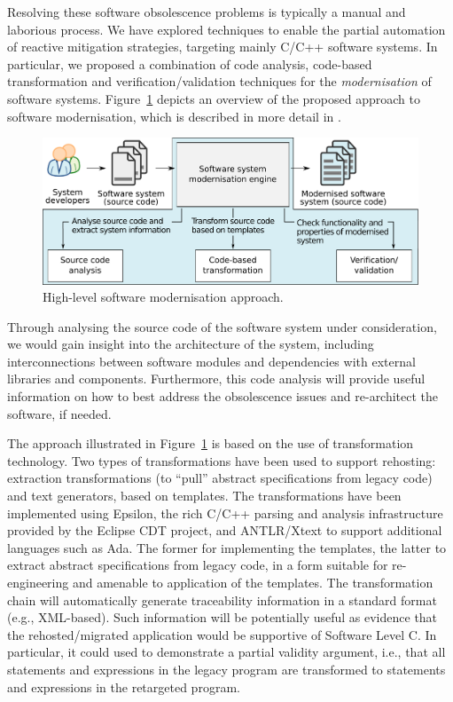 \documentclass{llncs}
\begin{document}
Resolving these software obsolescence problems is typically a manual and laborious process. We have explored techniques to enable the partial 
automation of reactive mitigation strategies, targeting mainly C/C++ software 
systems. In particular, we proposed a combination of code analysis, code-based 
transformation and verification/validation techniques for the 
\textit{modernisation} of software systems.
Figure~\ref{fig:approach} depicts an overview of the proposed approach to 
software modernisation, which is described in more detail in \cite{Gerasimou2017}.

\begin{figure}[htbp]
	\vspace*{-2em}
	\centering
	\includegraphics[width=.9\linewidth]{architecture.pdf}
	
	\caption{High-level software modernisation approach.}
	\label{fig:approach}
	
	\vspace*{-2em}
\end{figure}

Through analysing the source code of the software system under consideration, 
we would gain insight into the architecture of the system, including 
interconnections between software modules and dependencies with 
external libraries and components. Furthermore, this code analysis will provide 
useful information on how to best address the obsolescence issues and 
re-architect the software, if needed.

The approach illustrated in Figure~\ref{fig:approach} is based on the use of transformation technology.
Two types of transformations have been used to support rehosting: extraction 
transformations (to ``pull'' abstract specifications from legacy code) and text 
generators, based on templates. The transformations have been implemented using Epsilon, the rich C/C++ parsing and analysis 
infrastructure provided by the Eclipse CDT project, and ANTLR/Xtext to support 
additional languages 
such as Ada. The former for implementing the templates, the latter to extract 
abstract specifications from legacy code, in a form suitable for re-engineering 
and amenable to application of the templates. 
The transformation chain will automatically generate traceability 
information in a standard format (e.g., XML-based). Such information will be potentially useful as
evidence that the rehosted/migrated application would be supportive of Software Level C.
In particular, it could used to demonstrate a partial validity argument, 
i.e., that all statements and expressions in the legacy program are transformed 
to statements and expressions in the retargeted program. 
\end{document}
